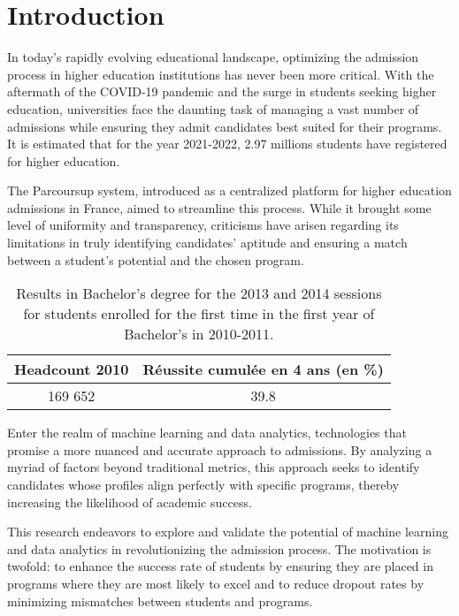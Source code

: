 \documentclass[conference]{IEEEtran}
\begin{document}
\section{Introduction}
In today's rapidly evolving educational landscape, optimizing the admission process in higher education institutions has never been more critical. With the aftermath of the COVID-19 pandemic and the surge in students seeking higher education, universities face the daunting task of managing a vast number of admissions while ensuring they admit candidates best suited for their programs. It is estimated that for the year 2021-2022, 2.97 millions students have registered for higher education.\cite{sous-direction_des_systemes_dinformation_et_des_etudes_statistiques_sies_les_2022} 

The Parcoursup system, introduced as a centralized platform for higher education admissions in France, aimed to streamline this process. While it brought some level of uniformity and transparency, criticisms have arisen regarding its limitations in truly identifying candidates' aptitude and ensuring a match between a student's potential and the chosen program.

\begin{table}
    \centering
    \caption{Results in Bachelor's degree for the 2013 and 2014 sessions for students enrolled for the first time in the first year of Bachelor's in 2010-2011.\cite{kabla-langlois_fporsoc16b_ec2_enseignementpdf_2016}}
    \begin{tabular}{|c|c|}
        \hline
         \textbf{Headcount 2010} & \textbf{Réussite cumulée en 4 ans (en \%)} \\
         \hline
         169 652 & 39.8 \\
         \hline
    \end{tabular}
    
    \label{tab:my_label}
\end{table}

Enter the realm of machine learning and data analytics, technologies that promise a more nuanced and accurate approach to admissions. By analyzing a myriad of factors beyond traditional metrics, this approach seeks to identify candidates whose profiles align perfectly with specific programs, thereby increasing the likelihood of academic success.

This research endeavors to explore and validate the potential of machine learning and data analytics in revolutionizing the admission process. The motivation is twofold: to enhance the success rate of students by ensuring they are placed in programs where they are most likely to excel and to reduce dropout rates by minimizing mismatches between students and programs.
\end{document}
